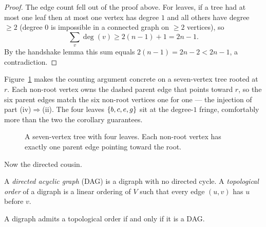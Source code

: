 \begin{proof}
The edge count fell out of the proof above. For leaves, if a tree had at most
one leaf then at most one vertex has degree $1$ and all others have degree
$\ge 2$ (degree $0$ is impossible in a connected graph on $\ge 2$ vertices), so
\[ \sum_v \deg(v) \ge 2(n-1) + 1 = 2n - 1. \]
By the handshake lemma this sum equals
$2(n-1) = 2n-2 < 2n-1$, a contradiction.
\end{proof}

Figure~\ref{fig:ch01-tree-injection} makes the counting argument concrete on a seven-vertex tree
rooted at $r$. Each non-root vertex owns the dashed parent edge that points
toward $r$, so the six parent edges match the six non-root vertices one for one
--- the injection of part (iv)$\Rightarrow$(ii). The four leaves $\{b,c,e,g\}$
sit at the degree-$1$ fringe, comfortably more than the two the corollary
guarantees.

\begin{figure}[htbp]
\centering
{}
\caption{A seven-vertex tree with four leaves. Each non-root vertex has exactly one parent edge pointing toward the root.}
\label{fig:ch01-tree-injection}
\end{figure}

Now the directed cousin.

\begin{definition}[DAG]
\label{ch01:def-dag}
A \emph{directed acyclic graph} (DAG) is a digraph with no directed cycle. A
\emph{topological order} of a digraph is a linear ordering of $V$ such that every
edge $(u,v)$ has $u$ before $v$.
\end{definition}

\begin{theorem}
\label{ch01:dag-topo}
A digraph admits a topological order if and only if it is a DAG.
\end{theorem}

